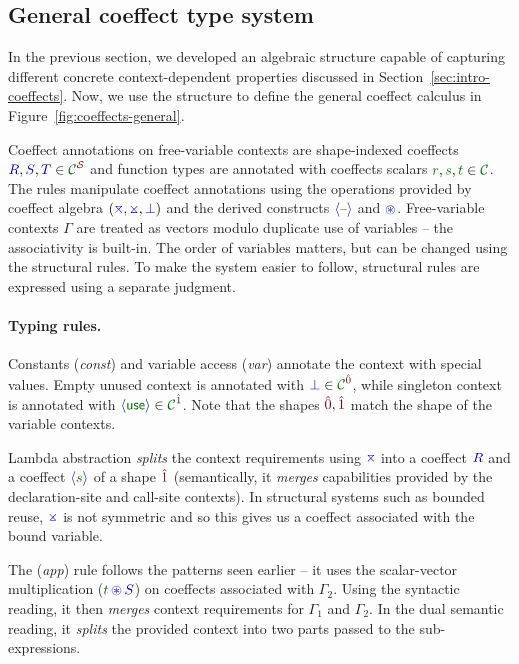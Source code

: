 
\subsection{General coeffect type system}

In the previous section, we developed an algebraic structure capable of
capturing different concrete context-dependent properties discussed in
Section~\ref{sec:intro-coeffects}. Now, we use the structure to
define the general coeffect calculus in
Figure~\ref{fig:coeffects-general}.

Coeffect annotations on free-variable contexts
are shape-indexed coeffects $\aclrd{R}, \aclrd{S}, \aclrd{T} \in \C^\SH$ 
and function types are annotated with
coeffects scalars $\cclrd{r}, \cclrd{s}, \cclrd{t} \in \C$.  The
rules manipulate coeffect annotations using the operations provided by
coeffect algebra $(\amerge, \asplit, \azero)$ and the derived
constructs $\alift{\textnormal{--}}$ and $\aseq$. Free-variable contexts $\Gamma$
are treated as vectors modulo duplicate use of variables 
-- the associativity is built-in. The order of
variables matters, but can be changed using the structural rules. To
make the system easier to follow, structural rules are expressed
using a separate judgment.

\paragraph{Typing rules.} 
Constants (\emph{const}) and variable access (\emph{var}) annotate the context with special
values. Empty unused context is annotated with $\azero
\in \C^\sempty$, while singleton context 
is annotated with $\aunit \in \C^\sunit$.  Note that the shapes
$\sempty, \sunit$ match the shape of the variable contexts.

Lambda abstraction \emph{splits} the context requirements using $\amerge$ into a coeffect 
$\aclrd{R}$ and a coeffect $\alift{\cclrd{s}}$ of a shape $\sunit$ (semantically, it \emph{merges}
capabilities provided by the declaration-site and call-site contexts). In structural systems such
as bounded reuse, $\asplit$ is not symmetric and so this gives us a coeffect associated with the bound variable.

The (\emph{app}) rule follows the patterns seen
earlier -- it uses the scalar-vector multiplication ($\cclrd{t}\,\aseq\,\aclrd{S}$) on 
coeffects associated with $\Gamma_2$.
Using the syntactic reading, it then \emph{merges} context requirements for $\Gamma_1$ and $\Gamma_2$.
In the dual semantic reading,
it \emph{splits} the provided context into two parts passed to the sub-expressions.

